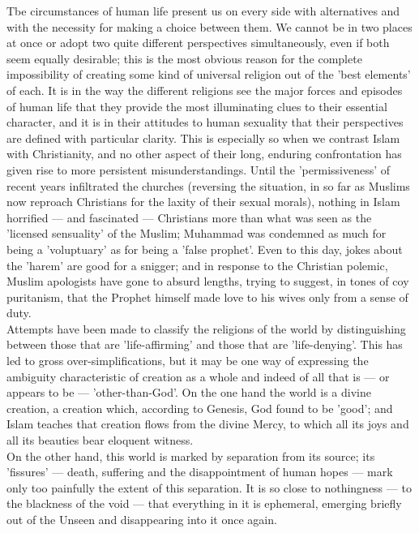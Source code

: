 \documentclass[11pt, b5paper, twoside]{book}
\begin{document}
Tbe circumstances of human life present us on every side with alternatives and with the necessity for 
making a choice between them. We cannot be in two places at once or adopt two quite different 
perspectives simultaneously, even if both seem equally desirable; this is the most obvious reason for 
the complete impossibility of creating some kind of universal religion out of the 'best elements' of 
each. It is in the way the different religions see the major forces and episodes of human life that 
they provide the most illuminating clues to their essential character, and it is in their attitudes 
to human sexuality that their perspectives are defined with particular clarity. This is especially so 
when we contrast Islam with Christianity, and no other aspect of their long, enduring confrontation 
has given rise to more persistent misunderstandings. Until the 'permissiveness' of recent years 
infiltrated the churches (reversing the situation, in so far as Muslims now reproach Christians for 
the laxity of their sexual morals), nothing in Islam horrified --- and fascinated --- Christians more 
than what was seen as the 'licensed sensuality' of the Muslim; Muhammad was condemned as much for 
being a 'voluptuary' as for being a 'false prophet'. Even to this day, jokes about the 'harem' are 
good for a snigger; and in response to the Christian polemic, Muslim apologists have gone to absurd 
lengths, trying to suggest, in tones of coy puritanism, that the Prophet himself made love to his 
wives only from a sense of duty. \\

Attempts have been made to classify the religions of the world by distinguishing between those that 
are 'life-affirming' and those that are 'life-denying'. This has led to gross over-simplifications, 
but it may be one way of expressing the ambiguity characteristic of creation as a whole and indeed of 
all that is --- or appears to be --- 'other-than-God'. On the one hand the world is a divine creation, a 
creation which, according to Genesis, God found to be 'good'; and Islam teaches that creation flows 
from the divine Mercy, to which all its joys and all its beauties bear eloquent witness. \\

On the other hand, this world is marked by separation from its source; its 'fissures' --- death, 
suffering and the disappointment of human hopes --- mark only too painfully the extent of this 
separation. It is so close to nothingness --- to the blackness of the void --- that everything in it is 
ephemeral, emerging briefly out of the Unseen and disappearing into it once again. \\
\end{document}
